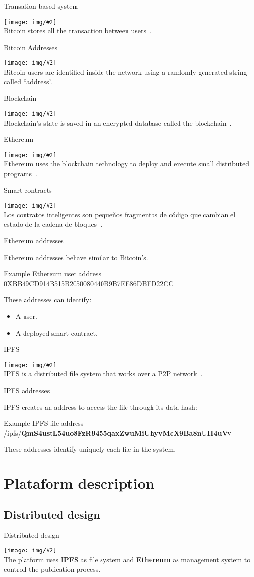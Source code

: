\documentclass{beamer}
\newcommand{\frameitc}[4]{
  \begin{frame}{#1}
    \begin{center}
      \texttt{[image: img/\#2]}\\
      #3~\cite{#4}.
    \end{center}
  \end{frame}
}
\newcommand{\frameitcp}[5]{
  \begin{frame}{#1}
    \begin{center}
      \texttt{[image: img/\#2]}\\
      #3~\cite{#4}.
    \end{center}
  \end{frame}
}
\newcommand{\frameit}[3]{
  \begin{frame}{#1}
    \begin{center}
      \texttt{[image: img/\#2]}\\
      #3.
    \end{center}
  \end{frame}
}
\newcommand{\framet}[2]{
  \begin{frame}{#1}
    #2
  \end{frame}
}
\begin{document}
\frameitc{Transation based system}{transaction.png}{Bitcoin stores all the transaction between users}{antonopoulos2014mastering}

\frameit{Bitcoin Addresses}{btcaddress.png}{Bitcoin users are identified inside the network using a randomly generated string called ``address''}

\frameitc{Blockchain}{blockchain.png}{Blockchain's state is saved in an encrypted database called the blockchain}{nakamoto2008bitcoin}

\frameitc{Ethereum}{EthereumLogo1200.jpg}{Ethereum uses the blockchain technology to deploy and execute small distributed programs}{nakamoto2008bitcoin}

\frameitc{Smart contracts}{sc.png}{Los contratos inteligentes son
  pequeños fragmentos de código que cambian el estado de la cadena de bloques}{buterin2014ethereum}
  
 \framet{Ethereum addresses}{
  Ethereum addresses behave similar to Bitcoin's.
\begin{block}{Example Ethereum user address}
0XBB49CD914B515B2050080440B9B7EE86DBFD22CC
\end{block}
These addresses can identify:
\begin{itemize}
    \item A user.
    \item A deployed smart contract.
\end{itemize}
}

\frameitcp{IPFS}{IPFS.png}{IPFS is a distributed file system that works over a P2P network}{benet2014ipfs}{0.7}

 \framet{IPFS addresses}{
  IPFS creates an address to access the file through its data hash:
\begin{block}{Example IPFS file address}
/ipfs/\textbf{QmS4ustL54uo8FzR9455qaxZwuMiUhyvMcX9Ba8nUH4uVv}
\end{block}
These addresses identify uniquely each file in the system.
}

\section{Plataform description}

\subsection{Distributed design}

\frameit{Distributed design}{eipfs.png}{The platform uses \textbf{IPFS} as file system and \textbf{Ethereum} as management system to controll the publication process}
\end{document}
